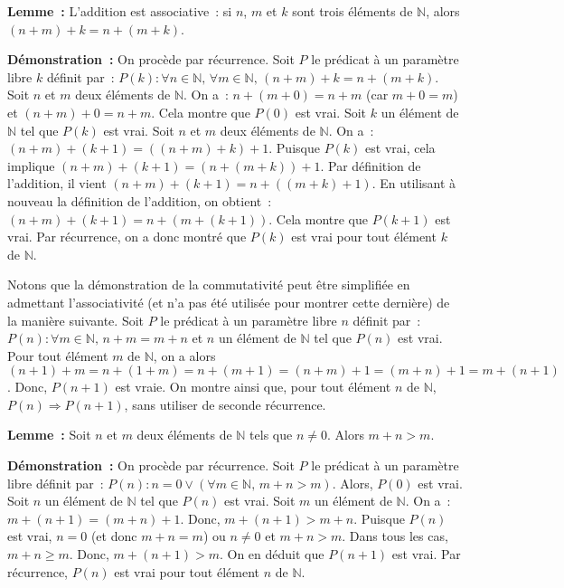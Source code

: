    \done 

\medskip

\noindent\textbf{Lemme :} L'addition est associative : si $n$, $m$ et $k$ sont trois éléments de $\mathbb{N}$, alors $(n+m)+k=n+(m+k)$. 

\medskip

\noindent\textbf{Démonstration :} On procède par récurrence. 
    Soit $P$ le prédicat à un paramètre libre $k$ définit par : $P(k): \forall n \in \mathbb{N}, \, \forall m \in \mathbb{N}, \, (n+m)+k = n+(m+k)$. 
    Soit $n$ et $m$ deux éléments de $\mathbb{N}$. 
    On a : $n+(m+0) = n+m$ (car $m+0=m$) et $(n+m)+0 = n+m$. 
    Cela montre que $P(0)$ est vrai. 
    Soit $k$ un élément de $\mathbb{N}$ tel que $P(k)$ est vrai. 
    Soit $n$ et $m$ deux éléments de $\mathbb{N}$. 
    On a : $(n+m)+(k+1) = ((n+m)+k)+1$. 
    Puisque $P(k)$ est vrai, cela implique $(n+m)+(k+1) = (n+(m+k))+1$. 
    Par définition de l'addition, il vient $(n+m)+(k+1) = n+((m+k)+1)$. 
    En utilisant à nouveau la définition de l'addition, on obtient : $(n+m)+(k+1)=n+(m+(k+1))$. 
    Cela montre que $P(k+1)$ est vrai.
    Par récurrence, on a donc montré que $P(k)$ est vrai pour tout élément $k$ de $\mathbb{N}$. 

   \done 

\medskip

Notons que la démonstration de la commutativité peut être simplifiée en admettant l'associativité (et n'a pas été utilisée pour montrer cette dernière) de la manière suivante. 
Soit $P$ le prédicat à un paramètre libre $n$ définit par : $P(n): \forall m \in \mathbb{N}, \, n+m=m+n$ et $n$ un élément de $\mathbb{N}$ tel que $P(n)$ est vrai. 
Pour tout élément $m$ de $\mathbb{N}$, on a alors $(n+1)+m = n+(1+m) = n+(m+1) = (n+m)+1 = (m+n)+1 = m+(n+1)$. 
Donc, $P(n+1)$ est vraie. 
On montre ainsi que, pour tout élément $n$ de $\mathbb{N}$, $P(n) \Rightarrow P(n+1)$, sans utiliser de seconde récurrence.

\medskip

\noindent\textbf{Lemme :} Soit $n$ et $m$ deux éléments de $\mathbb{N}$ tels que $n \neq 0$. Alors $m+n > m$. 

\medskip

\noindent\textbf{Démonstration :} On procède par récurrence.
    Soit $P$ le prédicat à un paramètre libre définit par : $P(n): n = 0 \vee ( \forall m \in \mathbb{N}, \, m+n > m)$. 
    Alors, $P(0)$ est vrai. 
    Soit $n$ un élément de $\mathbb{N}$ tel que $P(n)$ est vrai. 
    Soit $m$ un élément de $\mathbb{N}$. 
    On a : $m+(n+1) = (m+n)+1$. 
    Donc, $m+(n+1) > m+n$. 
    Puisque $P(n)$ est vrai, $n = 0$ (et donc $m+n=m$) ou $n \neq 0$ et $m+n > m$. 
    Dans tous les cas, $m+n \geq m$. 
    Donc, $m+(n+1) > m$. 
    On en déduit que $P(n+1)$ est vrai. 
    Par récurrence, $P(n)$ est vrai pour tout élément $n$ de $\mathbb{N}$.

